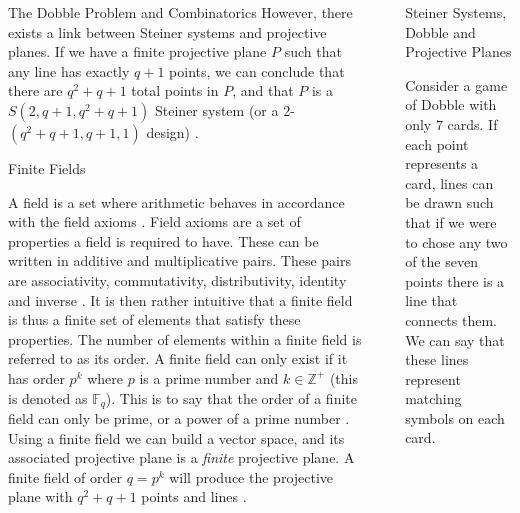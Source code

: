 \documentclass[final]{beamer}
\newlength{\sepwidth}
\newlength{\colwidth}
\newcommand{\separatorcolumn}{\begin{column}{\sepwidth}\end{column}}
\begin{document}
\begin{frame}[t]
\begin{columns}[t]
\begin{column}{\colwidth}
\begin{alertblock}{The Dobble Problem and Combinatorics}
However, there exists a link between Steiner systems and projective planes. If we have a finite projective plane $P$ such that any line has exactly $q+1$ points, we can conclude that there are $q^2+q+1$ total points in $P$, and that $P$ is a $S(2, q+ 1, q^2 +q+ 1)$
Steiner system (or a $2$-$(q^2 +q+ 1, q + 1, 1)$ design) \cite{storme2006}.
  \end{alertblock}
  
  \begin{block}{Finite Fields}

      A field is a set where arithmetic behaves in accordance with the field axioms \cite{Weisstein2023b}. Field axioms are a set of properties a field is required to have. These can be written in additive and multiplicative pairs. These pairs are associativity, commutativity, distributivity, identity and inverse \cite{Weisstein2023}. It is then rather intuitive that a finite field is thus a finite set of elements that satisfy these properties. The number of elements within a finite field is referred to as its order. A finite field can only exist if it has order $p^k$ where $p$ is a prime number and $k\in\mathbb{Z}^+$ \cite{cameron2000} (this is denoted as $\mathbb{F}_q$). This is to say that the order of a finite field can only be prime, or a power of a prime number \cite{cameron2000}. Using a finite field we can build a vector space, and its associated projective plane is a \emph{finite} projective plane. A finite field of order $q=p^k$ will produce the projective plane with $q^2+q+1$ points and lines \cite{Collingridge2018}.

  \end{block}

\end{column}

\separatorcolumn

\begin{column}{\colwidth}

\begin{block}{Steiner Systems, Dobble and Projective Planes}

    Consider a game of Dobble with only $7$ cards. If each point represents a card, lines can be drawn such that if we were to chose any two of the seven points there is a line that connects them. We can say that these lines represent matching symbols on each card. 


\end{block}
\end{column}
\end{columns}
\end{frame}
\end{document}

